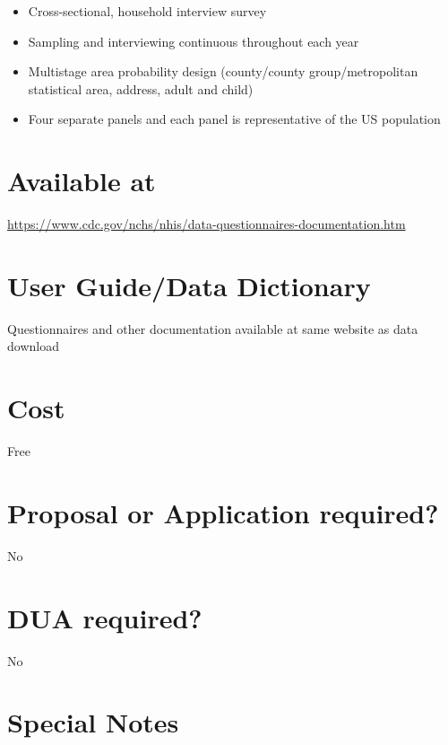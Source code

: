 \documentclass[
]{book}
\providecommand{\tightlist}{%
  \setlength{\itemsep}{0pt}\setlength{\parskip}{0pt}}
\begin{document}
\begin{itemize}
\tightlist
\item
  Cross-sectional, household interview survey
\item
  Sampling and interviewing continuous throughout each year
\item
  Multistage area probability design (county/county group/metropolitan statistical area, address, adult and child)
\item
  Four separate panels and each panel is representative of the US population
\end{itemize}

\hypertarget{available-at-50}{%
\section{Available at}\label{available-at-50}}

\url{https://www.cdc.gov/nchs/nhis/data-questionnaires-documentation.htm}

\hypertarget{user-guidedata-dictionary-50}{%
\section{User Guide/Data Dictionary}\label{user-guidedata-dictionary-50}}

Questionnaires and other documentation available at same website as data download

\hypertarget{cost-50}{%
\section{Cost}\label{cost-50}}

Free

\hypertarget{proposal-or-application-required-50}{%
\section{Proposal or Application required?}\label{proposal-or-application-required-50}}

No

\hypertarget{dua-required-50}{%
\section{DUA required?}\label{dua-required-50}}

No

\hypertarget{special-notes-50}{%
\section{Special Notes}\label{special-notes-50}}
\end{document}
